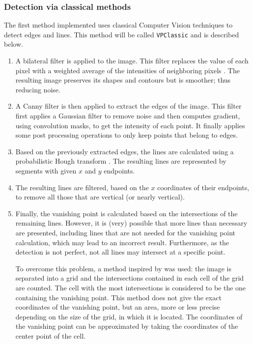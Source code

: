 \subsubsection{Detection via classical methods}

The first method implemented uses classical Computer Vision techniques to detect edges and lines. This method will be called \texttt{VPClassic} and is described below.

\begin{enumerate}
    \item A bilateral filter is applied to the image. This filter replaces the value of each pixel with a weighted average of the intensities of neighboring pixels \cite{wikipedia2021bilateralfilter}. The resulting image preserves its shapes and contours but is smoother; thus reducing noise.
    \item A Canny filter \cite{canny1986computational} is then applied to extract the edges of the image. This filter first applies a Gaussian filter to remove noise and then computes gradient, using convolution masks, to get the intensity of each point. It finally applies some post processing operations to only keep points that belong to edges.
    \item Based on the previously extracted edges, the lines are calculated using a probabilistic Hough transform \cite{kiryati1991probabilistic}. The resulting lines are represented by segments with given $x$ and $y$ endpoints.
    \item The resulting lines are filtered, based on the $x$ coordinates of their endpoints, to remove all those that are vertical (or nearly vertical).
    \item Finally, the vanishing point is calculated based on the intersections of the remaining lines. However, it is (very) possible that more lines than necessary are presented, including lines that are not needed for the vanishing point calculation, which may lead to an incorrect result. Furthermore, as the detection is not perfect, not all lines may intersect at a specific point.

    To overcome this problem, a method inspired by \cite{github2019vanishingpointdetection} was used: the image is separated into a grid and the intersections contained in each cell of the grid are counted. The cell with the most intersections is considered to be the one containing the vanishing point. This method does not give the exact coordinates of the vanishing point, but an area, more or less precise depending on the size of the grid, in which it is located. The coordinates of the vanishing point can be approximated by taking the coordinates of the center point of the cell.
\end{enumerate}

